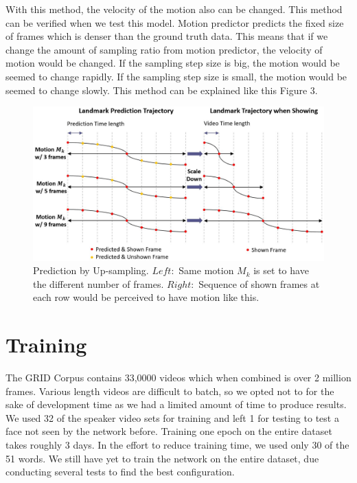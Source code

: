 \documentclass[10pt,twocolumn,letterpaper]{article}
\begin{document}
With this method, the velocity of the motion also can be changed. This method can be verified when we test this model. Motion predictor predicts the fixed size of frames which is denser than the ground truth data. This means that if we change the amount of sampling ratio from motion predictor, the velocity of motion would be changed. If the sampling step size is big, the motion would be seemed to change rapidly. If the sampling step size is small, the motion would be seemed to change slowly. This method can be explained like this Figure 3.

\begin{figure}[h]
\begin{center}
\includegraphics [scale=0.33] {images/upsample2.JPG}
\end{center}
\caption{Prediction by Up-sampling. $Left:$ Same motion $M_k$ is set to have the different number of frames. $Right:$ Sequence of shown frames at each row would be perceived to have motion like this.}
\label{fig:short}
\label{fig:onecol}
\end{figure}


\section{Training}
 The GRID Corpus contains 33,0000 videos which when combined is over 2 million frames. Various length videos are difficult to batch, so we opted not to for the sake of development time as we had a limited amount of time to produce results. We used 32 of the speaker video sets for training and left 1 for testing to test a face not seen by the network before. Training one epoch on the entire dataset takes roughly 3 days. In the effort to reduce training time, we used only 30 of the 51 words. We still have yet to train the network on the entire dataset, due conducting several tests to find the best configuration.
\end{document}

